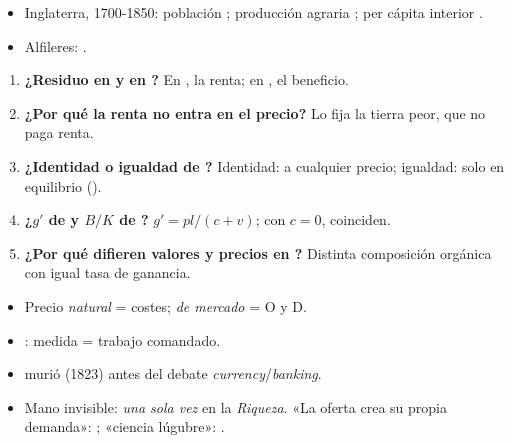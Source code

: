 \documentclass{article}
\begin{document}
\begin{columnas}
\anexorepaso
{}
\begin{itemize}
\item Inglaterra, 1700-1850: población ; producción agraria ; per cápita interior .
\item Alfileres: .
\end{itemize}
\begin{enumerate}
\item \textbf{¿Residuo en  y en ?} En , la renta; en , el beneficio.
\item \textbf{¿Por qué la renta no entra en el precio?} Lo fija la tierra peor, que no paga renta.
\item \textbf{¿Identidad o igualdad de ?} Identidad: a cualquier precio; igualdad: solo en equilibrio ().
\item \textbf{¿$g'$ de  y $B/K$ de ?} $g'=\mathit{pl}/(c+v)$; con $c=0$, coinciden.
\item \textbf{¿Por qué difieren valores y precios en ?} Distinta composición orgánica con igual tasa de ganancia.
\end{enumerate}
\begin{trampa}
\begin{itemize}
\item Precio \emph{natural} = costes; \emph{de mercado} = O y D.
\item {}: medida = trabajo comandado.
\item {} murió (1823) antes del debate \emph{currency}/\emph{banking}.
\item Mano invisible: \emph{una sola vez} en la \emph{Riqueza}. «La oferta crea su propia demanda»: ; «ciencia lúgubre»: .
\end{itemize}
\end{trampa}

\end{columnas}
\end{document}
